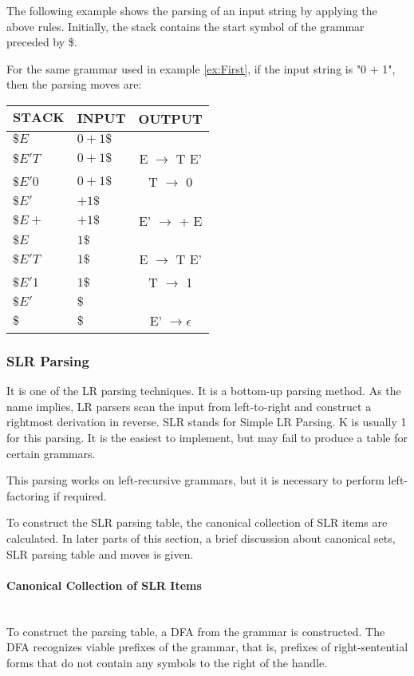 The following example shows the parsing of an input string by applying the above rules. Initially, the stack contains the start symbol of the grammar preceded by \$.
\begin{example}
\label{ex:LL moves}
For the same grammar used in example \ref{ex:First}, if the input string is "0 + 1", then the parsing moves are:
\begin{center}
\begin{tabular}{ |>{\raggedright\arraybackslash$}p{3cm}<{$}|>{\raggedleft\arraybackslash$}p{3cm}<{$}|c| } 
 \hline
 \textbf{STACK} & \textbf{INPUT} & \textbf{OUTPUT} \\
 \hline
 \$ E & 0 + 1 \$ & \\
 \$ E' T & 0 + 1 \$ & E $\to$ T E' \\ 
 \$ E' 0 & 0 + 1 \$ & T $\to$ 0 \\
 \$ E' & + 1 \$ & \\
 \$ E + & + 1 \$ & E' $\to$ + E \\
 \$ E & 1 \$ & \\  
 \$ E' T & 1 \$ & E $\to$ T E' \\
 \$ E' 1 & 1 \$ & T $\to$ 1 \\
 \$ E' & \$ & \\
 \$ & \$ & E' $\to \epsilon$ \\
 \hline
\end{tabular}
\end{center}
\end{example}

\subsubsection{SLR Parsing}
\label{ssubsec:SLR Parsing}
It is one of the LR parsing techniques. It is a bottom-up parsing method. As the name implies, LR parsers scan the input from left-to-right and construct a rightmost derivation in reverse. SLR stands for Simple LR Parsing. K is usually 1 for this parsing. It is the easiest to implement, but may fail to produce a table for certain grammars.

This parsing works on left-recursive grammars, but it is necessary to perform left-factoring if required.

To construct the SLR parsing table, the canonical collection of SLR items are calculated. In later parts of this section, a brief discussion about canonical sets, SLR parsing table and moves is given.

\paragraph{Canonical Collection of SLR Items}\mbox{}\\
\label{para:Canonical Set}
To construct the parsing table, a DFA from the grammar is constructed. The DFA recognizes viable prefixes of the grammar, that is, prefixes of right-sentential forms that do not contain any symbols to the right of the handle.

